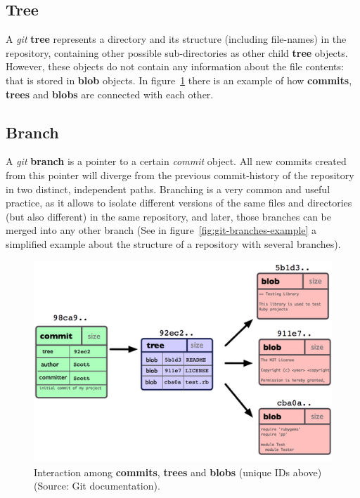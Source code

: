 \documentclass[a4paper, 12pt]{book}
\begin{document}
\subsection{Tree}
\label{ssec:git-tree}
A \emph{git} \textbf{tree} represents a directory and its structure (including file-names) in the repository, containing other possible
sub-directories as other child \textbf{tree} objects. However, these objects do not contain any information about the file contents:
that is stored in \textbf{blob} objects. In figure~\ref{fig:git-objs-example} there is an example of how \textbf{commits},
\textbf{trees} and \textbf{blobs} are connected with each other.
\subsection{Branch}
\label{ssec:git-branch}
A \emph{git} \textbf{branch} is a pointer to a certain \emph{commit} object. All new commits
created from this pointer will diverge from the previous commit-history of the repository in two distinct, independent paths.
Branching is a very common and useful practice, as it allows to isolate different versions of the same files and directories
(but also different) in the same repository, and later, those branches can be merged into any other branch (See in
figure~\ref{fig:git-branches-example} a simplified example about the structure of a repository with several branches).
\begin{figure}
  \centering
  \includegraphics[width=12cm, keepaspectratio]{img/git-objs-example}
  \caption{Interaction among \textbf{commits}, \textbf{trees} and \textbf{blobs} (unique IDs above) (Source: Git documentation).}
  \label{fig:git-objs-example}
\end{figure}
\end{document}
